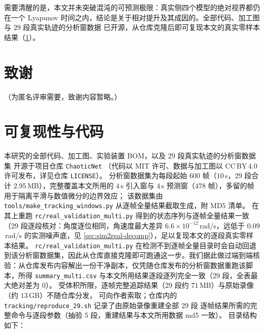 \documentclass[a4paper,12pt]{ctexart}   %
\renewcommand{\emph}[1]{#1}
\begin{document}
需要清醒的是，本文并未突破混沌的可预测极限：真实侧四个模型的绝对视界都仍在一个 Lyapunov
时间之内，结论是关于\emph{相对提升及其成因}的。全部代码、加工图与 29 段真实轨迹的分析窗数据
已开源，从仓库克隆后即可复现本文的真实零样本结果（\cref{sec:appendix-reproducibility}）。

\section*{致谢}
（为匿名评审需要，致谢内容暂略。）

\printbibliography[title={参考文献}]

\appendix
\section{可复现性与代码}
\label{sec:appendix-reproducibility}

本研究的全部代码、加工图、实验装置 BOM，以及 29 段真实轨迹的\emph{分析窗数据集}
开源于项目仓库 \texttt{ChaoticNet}
（代码以 MIT 许可、数据与加工图以 CC\,BY\,4.0 许可发布，详见仓库 \texttt{LICENSE}）。
分析窗数据集为每段起始 $600$ 帧（$10$\,s，29 段合计 $2.95$\,MB），完整覆盖本文所用的
$4$\,s 引入窗与 $4$\,s 预测窗（$478$ 帧），多留的帧用于隔离平滑与数值微分的边界效应；
该数据集由 \texttt{tools/make\_tracking\_windows.py} 从逐帧全量结果截取生成，附 MD5 清单。
在其上重跑 \texttt{rc/real\_validation\_multi.py} 得到的状态序列与逐帧全量结果一致
（29 段逐段核对：角度逐位相同，角速度最大差异 $6.6 \times 10^{-12}$\,rad/s，远低于
$0.09$\,rad/s 的实测噪声底，见 \cref{sec:sim2real-decomp}），足以复现本文的逐段真实零样本结果。
\texttt{rc/real\_validation\_multi.py} 在检测不到逐帧全量目录时会自动回退到该分析窗数据集，因此从仓库直接克隆即可跑通这一步。我们据此做过端到端核验：从仓库发布内容解出一份干净副本，仅凭随仓库发布的分析窗数据重跑该脚本，所得 \texttt{summary\_multi.csv} 与本文所用结果逐段逐列完全一致（29 段，全表最大绝对差为 $0$）。
受体积所限，逐帧完整追踪结果（29 段约 $71$\,MB）与原始录像（约 $13$\,GB）不随仓库分发，
可向作者索取；仓库内的 \texttt{tracking/reproduce\_29.sh} 记录了由原始录像重建全部 29 段
逐帧结果所需的完整命令与逐段参数（抽验 5 段，重建结果与本文所用数据 md5 一致）。
目录结构如下：
\end{document}
